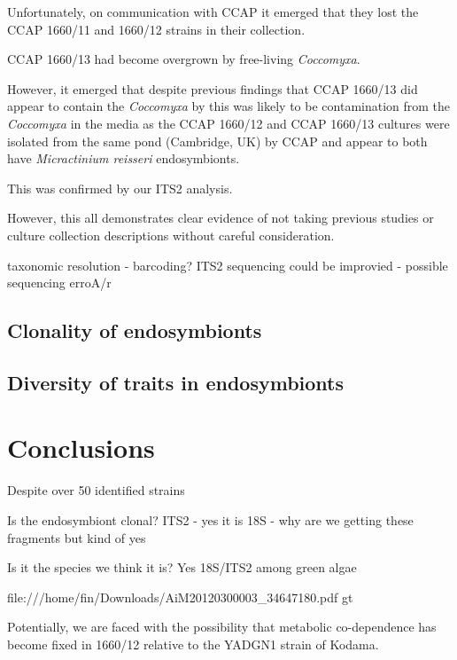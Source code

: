 Unfortunately, on communication with CCAP it emerged that they lost
the CCAP 1660/11 and 1660/12 strains in their collection. 


CCAP 1660/13 had become overgrown by free-living \textit{Coccomyxa}. 

However, it emerged that despite previous findings that CCAP 1660/13
did appear to contain the \textit{Coccomyxa} by \citep{Imamura2008} this was
likely to be contamination from the \textit{Coccomyxa} in the media as 
the CCAP 1660/12 and CCAP 1660/13 cultures were isolated from the same
pond (Cambridge, UK) by CCAP and appear to both have \textit{Micractinium
reisseri} endosymbionts.

This was confirmed by our ITS2 analysis.


However, this all demonstrates clear evidence of not taking previous studies
or culture collection descriptions without careful consideration.





taxonomic resolution - barcoding?
ITS2 sequencing could be improvied - possible sequencing erroA/r 


\subsection{Clonality of endosymbionts}



\subsection{Diversity of traits in endosymbionts}



\section{Conclusions}

Despite over 50 identified strains 


Is the endosymbiont clonal?
ITS2 - yes it is
18S - why are we getting these fragments but kind of yes

Is it the species we think it is?
Yes 18S/ITS2 among green algae


file:///home/fin/Downloads/AiM20120300003_34647180.pdf
gt





Potentially, we are faced with the possibility that metabolic co-dependence has become fixed in 1660/12
relative to the YADGN1 strain of Kodama.


